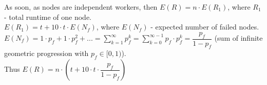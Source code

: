 As soon, as nodes are independent workers, then $E(R) = n \cdot E(R_1)$, where $R_1$ - total runtime of one node.\\
$E(R_1) = t + 10\cdot t \cdot E(N_f)$, where $E(N_f)$ - expected number of failed nodes.\\
$E(N_f) = 1 \cdot p_f + 1 \cdot p_f^2 +... = \sum_{k = 1}^{\infty} p_f^k = \sum_{k = 0}^{\infty - 1} p_f\cdot p_f^k = \dfrac{p_f}{1 - p_f}$ (sum of infinite geometric progression with $p_f \in [0, 1)$).\\
Thus $E(R) = n\cdot (t + 10 \cdot t \cdot \dfrac{p_f}{1 - p_f})$